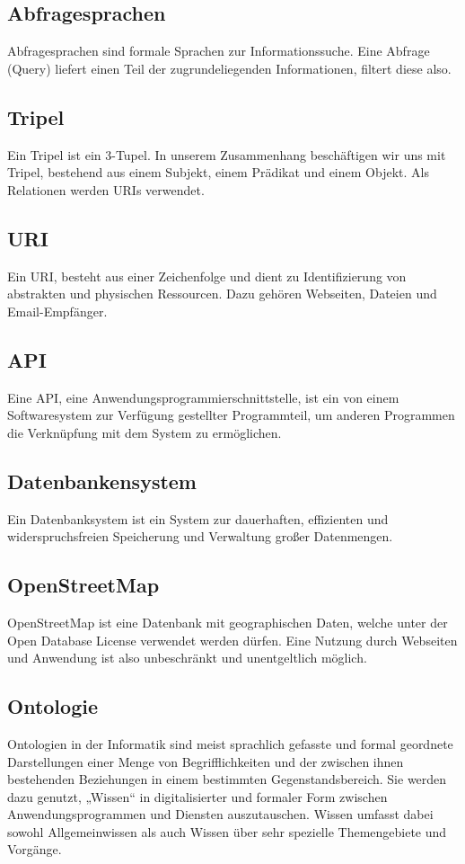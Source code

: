 \documentclass[11pt,a4paper]{article}
\begin{document}
\subsection{Abfragesprachen}
Abfragesprachen sind formale Sprachen zur Informationssuche. Eine  Abfrage (Query) liefert einen Teil der zugrundeliegenden Informationen, filtert diese also.



\subsection{Tripel}
Ein Tripel ist ein 3-Tupel. In unserem Zusammenhang beschäftigen wir uns mit Tripel, bestehend aus einem Subjekt, einem Prädikat und einem Objekt. Als Relationen werden URIs verwendet.
\subsection{URI}
Ein URI, besteht aus einer  Zeichenfolge und dient zu Identifizierung von abstrakten und physischen  Ressourcen. Dazu gehören Webseiten, Dateien und Email-Empfänger.

\subsection{API}
Eine API, eine  Anwendungsprogrammierschnittstelle, ist ein von einem Softwaresystem zur  Verfügung gestellter Programmteil, um anderen Programmen die  Verknüpfung mit dem System zu ermöglichen.
\subsection{Datenbankensystem}
Ein Datenbanksystem ist ein  System zur dauerhaften, effizienten und widerspruchsfreien Speicherung  und Verwaltung großer Datenmengen.
\subsection{OpenStreetMap}
OpenStreetMap ist eine  Datenbank mit geographischen Daten, welche unter der Open Database License verwendet werden dürfen. Eine Nutzung durch Webseiten und  Anwendung ist also unbeschränkt und unentgeltlich möglich.
\subsection{Ontologie}
Ontologien in der Informatik  sind meist sprachlich gefasste und formal geordnete Darstellungen einer  Menge von Begrifflichkeiten und der zwischen ihnen bestehenden  Beziehungen in einem bestimmten Gegenstandsbereich. Sie werden dazu  genutzt, „Wissen“ in digitalisierter und formaler Form zwischen Anwendungsprogrammen  und Diensten auszutauschen. Wissen umfasst dabei sowohl Allgemeinwissen  als auch Wissen über sehr spezielle Themengebiete und Vorgänge.
\end{document}
